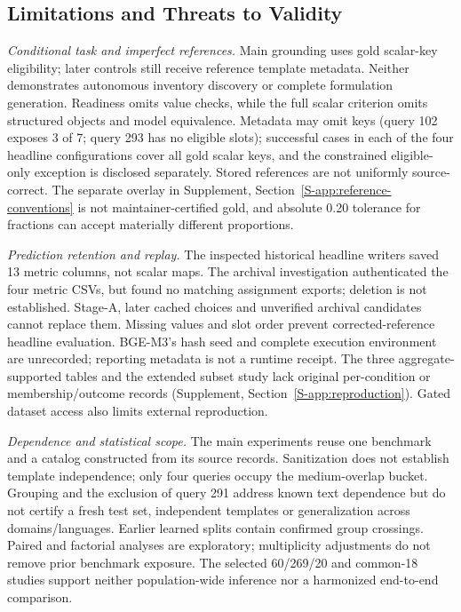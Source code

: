 \documentclass[pdflatex,sn-basic,Numbered]{sn-jnl}
\begin{document}
\subsection{Limitations and Threats to Validity}
\label{subsec:limitations}

\emph{Conditional task and imperfect references.} Main grounding uses gold scalar-key eligibility; later controls still receive reference template metadata. Neither demonstrates autonomous inventory discovery or complete formulation generation. Readiness omits value checks, while the full scalar criterion omits structured objects and model equivalence. Metadata may omit keys (query 102 exposes 3 of 7; query 293 has no eligible slots); successful cases in each of the four headline configurations cover all gold scalar keys, and the constrained eligible-only exception is disclosed separately. Stored references are not uniformly source-correct. The separate overlay in Supplement, Section~\ref{S-app:reference-conventions} is not maintainer-certified gold, and absolute 0.20 tolerance for fractions can accept materially different proportions.

\emph{Prediction retention and replay.} The inspected historical headline writers saved 13 metric columns, not scalar maps. The archival investigation authenticated the four metric CSVs, but found no matching assignment exports; deletion is not established. Stage-A, later cached choices and unverified archival candidates cannot replace them. Missing values and slot order prevent corrected-reference headline evaluation. BGE-M3's hash seed and complete execution environment are unrecorded; reporting metadata is not a runtime receipt. The three aggregate-supported tables and the extended subset study lack original per-condition or membership/outcome records (Supplement, Section~\ref{S-app:reproduction}). Gated dataset access also limits external reproduction.

\emph{Dependence and statistical scope.} The main experiments reuse one benchmark and a catalog constructed from its source records. Sanitization does not establish template independence; only four queries occupy the medium-overlap bucket. Grouping and the exclusion of query 291 address known text dependence but do not certify a fresh test set, independent templates or generalization across domains/languages. Earlier learned splits contain confirmed group crossings. Paired and factorial analyses are exploratory; multiplicity adjustments do not remove prior benchmark exposure. The selected 60/269/20 and common-18 studies support neither population-wide inference nor a harmonized end-to-end comparison.
\end{document}
